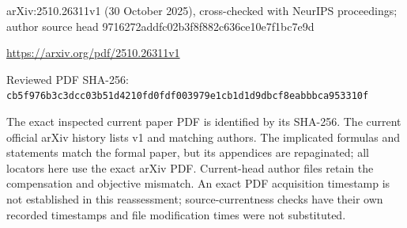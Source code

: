 \documentclass[11pt]{article}
\begin{document}
arXiv:2510.26311v1 (30 October 2025), cross-checked with NeurIPS proceedings; author source head 9716272addfc02b3f8f882c636ce10e7f1bc7e9d

\url{https://arxiv.org/pdf/2510.26311v1}

Reviewed PDF SHA-256: \nolinkurl{cb5f976b3c3dcc03b51d4210fd0fdf003979e1cb1d1d9dbcf8eabbbca953310f}

The exact inspected current paper PDF is identified by its SHA-256. The current official arXiv history lists v1 and matching authors. The implicated formulas and statements match the formal paper, but its appendices are repaginated; all locators here use the exact arXiv PDF. Current-head author files retain the compensation and objective mismatch. An exact PDF acquisition timestamp is not established in this reassessment; source-currentness checks have their own recorded timestamps and file modification times were not substituted.
\end{document}
